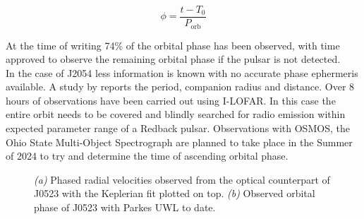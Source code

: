 \begin{equation}
    \phi = \frac{t - T_0}{P_{\text{orb}}}
    \label{eq: orbital phase}
\end{equation}

At the time of writing 74\% of the orbital phase has been observed, with time approved to observe the remaining orbital phase if the pulsar is not detected. \\

In the case of J2054 less information is known with no accurate phase ephermeris available. A study by \cite{karpova_new_2023} reports the period, companion radius and distance. Over 8 hours of observations have been carried out using I-LOFAR. In this case the entire orbit needs to be covered and blindly searched for radio emission within expected parameter range of a Redback pulsar. Observations with OSMOS, the Ohio State Multi-Object Spectrograph \citep{martini_ohio_2011} are planned to take place in the Summer of 2024 to try and determine the time of ascending orbital phase. 

\begin{figure}[h] %
    \centering
    \qquad
    \caption{\textit{(a)} Phased radial velocities observed from the optical counterpart of J0523 with the Keplerian fit plotted on top. \textit{(b)} Observed orbital phase of J0523 with Parkes UWL to date. }%
    \label{fig: velocities}%
\end{figure}


